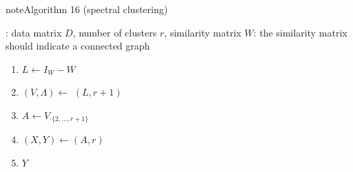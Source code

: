 \documentclass[letterpaper,10pt,english]{jupyterBook}
\begin{document}
\begin{sphinxadmonition}{note}{Algorithm 16 (spectral clustering)}



\sphinxAtStartPar
{}: data matrix \(D\), number of clusters \(r\), similarity matrix \(W\): the similarity matrix should indicate a connected graph
\begin{enumerate}
%
\item {} 
\sphinxAtStartPar
\(L\gets I_W-W\) 

\item {} 
\sphinxAtStartPar
\((V,\Lambda) \gets\) \((L,r+1)\)

\item {} 
\sphinxAtStartPar
\(A\leftarrow V_{\cdot\{2,\ldots, r+1\}}\) 

\item {} 
\sphinxAtStartPar
\((X,Y)\gets\)\((A,r)\)

\item {} 
\sphinxAtStartPar
{} \(Y\)

\end{enumerate}
\end{sphinxadmonition}
\end{document}

